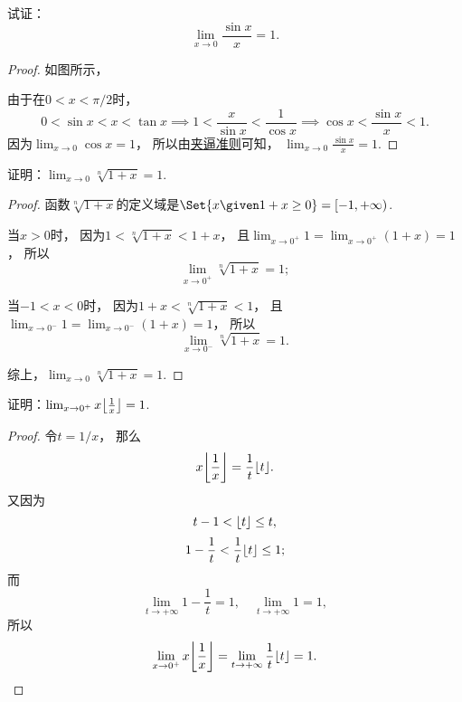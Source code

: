 \begin{example}[重要极限I]
试证：\begin{equation}\label{equation:极限.重要极限I}
\lim_{x\to0} \frac{\sin x}{x} = 1.
\end{equation}
\begin{proof}
如图所示，
\begin{center}
\end{center}
由于在\(0 < x < \pi/2\)时，\[
	0 < \sin x < x < \tan x
	\implies
	1 < \frac{x}{\sin x} < \frac{1}{\cos x}
	\implies
	\cos x < \frac{\sin x}{x} < 1.
\]
因为\(\lim_{x\to0}\cos x = 1\)，
所以由\hyperref[theorem:数列极限.夹逼准则]{夹逼准则}可知，
\(\lim_{x\to0} \frac{\sin x}{x} = 1\).
\end{proof}
\end{example}

\begin{example}
证明：\(\lim_{x\to0} \sqrt[n]{1+x} = 1\).
\begin{proof}
函数\(\sqrt[n]{1+x}\)的定义域是\(\Set{ x \given 1+x\geq 0 } = [-1,+\infty)\).

当\(x > 0\)时，
因为\(1 < \sqrt[n]{1+x} < 1+x\)，
且\(\lim_{x\to0^+} 1 = \lim_{x\to0^+}(1+x) = 1\)，
所以\[
	\lim_{x\to0^+} \sqrt[n]{1+x} = 1;
\]

当\(-1 < x < 0\)时，
因为\(1+x < \sqrt[n]{1+x} < 1\)，
且\(\lim_{x\to0^-} 1 = \lim_{x\to0^-}(1+x) = 1\)，
所以\[
	\lim_{x\to0^-} \sqrt[n]{1+x} = 1.
\]

综上，\(\lim_{x\to0} \sqrt[n]{1+x} = 1\).
\end{proof}
\end{example}

\begin{example}
证明：\(\lim_{x\to0^+} x \floor*{\frac1x} = 1\).
\begin{proof}
令\(t=1/x\)，
那么\[
	x \floor*{\frac1x} = \frac{1}{t} \floor{t}.
\]
又因为\[
	t - 1 < \lfloor t\rfloor \leq t,
\]\[
	1 - \frac{1}{t} < \frac{1}{t} \lfloor t\rfloor \leq 1;
\]
而\[
	\lim_{t\to+\infty} 1 - \frac{1}{t} = 1,
	\quad
	\lim_{t\to+\infty} 1 = 1,
\]
所以\[
	\lim_{x\to0^+} x \floor*{\frac1x} = \lim_{t\to+\infty} \frac{1}{t} \floor{t} = 1.
	\qedhere
\]
\end{proof}
\end{example}

